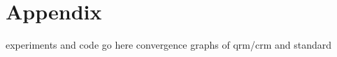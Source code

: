\appendix
\section{Appendix}

\begin{notes}
    experiments and code go here
    convergence graphs of qrm/crm and standard
\end{notes}

